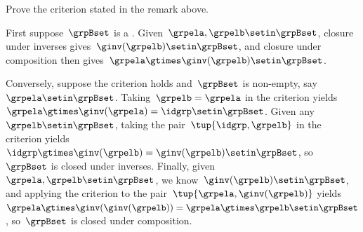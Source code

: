 \begin{exercise}
    \label{ex:subgroup-criterion}
    Prove the criterion stated in the remark above.
\end{exercise}
\begin{solution}
    First suppose~$\grpBset$ is a .
    Given~$\grpela, \grpelb \setin \grpBset$, closure under inverses gives~$\ginv(\grpelb) \setin \grpBset$, and closure under composition then gives~$\grpela \gtimes \ginv(\grpelb) \setin \grpBset$.

    Conversely, suppose the criterion holds and~$\grpBset$ is non-empty, say~$\grpela \setin \grpBset$.
    Taking~$\grpelb = \grpela$ in the criterion yields~$\grpela \gtimes \ginv(\grpela) = \idgrp \setin \grpBset$.
    Given any~$\grpelb \setin \grpBset$, taking the pair~$\tup{\idgrp, \grpelb}$ in the criterion yields~$\idgrp \gtimes \ginv(\grpelb) = \ginv(\grpelb) \setin \grpBset$, so~$\grpBset$ is closed under inverses.
    Finally, given~$\grpela, \grpelb \setin \grpBset$, we know~$\ginv(\grpelb) \setin \grpBset$, and applying the criterion to the pair~$\tup{\grpela, \ginv(\grpelb)}$ yields~$\grpela \gtimes \ginv(\ginv(\grpelb)) = \grpela \gtimes \grpelb \setin \grpBset$, so~$\grpBset$ is closed under composition.
\end{solution}
